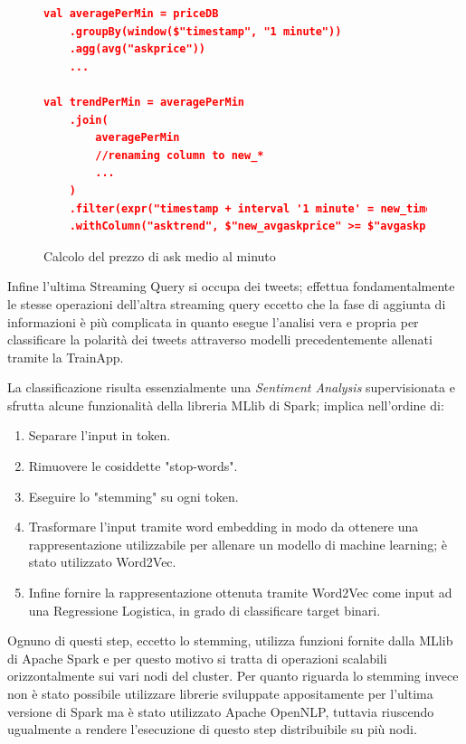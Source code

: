 \begin{figure}
    \begin{lstlisting}[language=json,firstnumber=1]
val averagePerMin = priceDB
    .groupBy(window($"timestamp", "1 minute"))
    .agg(avg("askprice"))
    ...

val trendPerMin = averagePerMin
    .join(
        averagePerMin
        //renaming column to new_*
        ...
    )
    .filter(expr("timestamp + interval '1 minute' = new_timestamp"))
    .withColumn("asktrend", $"new_avgaskprice" >= $"avgaskprice")
    \end{lstlisting}
    \caption{Calcolo del prezzo di ask medio al minuto}
    \label{trendpermin}
\end{figure}

Infine l'ultima Streaming Query si occupa dei tweets; effettua fondamentalmente le stesse operazioni
dell'altra streaming query eccetto che la fase di aggiunta di informazioni è più complicata in quanto
esegue l'analisi vera e propria per classificare la polarità dei tweets attraverso modelli
precedentemente allenati tramite la TrainApp.

La classificazione risulta essenzialmente una \textit{Sentiment Analysis} supervisionata e sfrutta alcune
funzionalità della libreria MLlib di Spark; implica nell'ordine di:

\begin{enumerate}
    \item Separare l'input in token.
    \item Rimuovere le cosiddette "stop-words".
    \item Eseguire lo "stemming" su ogni token.
    \item Trasformare l'input tramite word embedding in modo da ottenere una rappresentazione
    utilizzabile per allenare un modello di machine learning; è stato utilizzato
    Word2Vec.
    \item Infine fornire la rappresentazione ottenuta tramite Word2Vec come input ad una Regressione
    Logistica, in grado di classificare target binari.
\end{enumerate}

Ognuno di questi step, eccetto lo stemming, utilizza funzioni fornite dalla MLlib di Apache Spark
e per questo motivo si tratta di operazioni scalabili orizzontalmente sui vari nodi del cluster.
Per quanto riguarda lo stemming invece non è stato possibile utilizzare librerie sviluppate
appositamente per l'ultima versione di Spark ma è stato utilizzato Apache OpenNLP, tuttavia
riuscendo ugualmente a rendere l'esecuzione di questo step distribuibile su più nodi.

